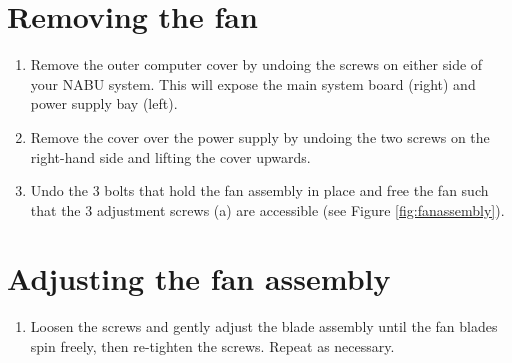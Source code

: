 \section{Removing the fan}
\begin{enumerate}
	\item Remove the outer computer cover by undoing the screws on either side of your NABU system. This will expose the main system board (right) and power supply bay (left).
	\item Remove the cover over the power supply by undoing the two screws on the right-hand side and lifting the cover upwards.
	\item Undo the 3 bolts that hold the fan assembly in place and free the fan such that the 3 adjustment screws (a) are accessible (see Figure \ref{fig:fanassembly}).
\end{enumerate}
\section{Adjusting the fan assembly}
\begin{enumerate}
	\item Loosen the screws and gently adjust the blade assembly until the fan blades spin freely, then re-tighten the screws. Repeat as necessary.
\end{enumerate}
